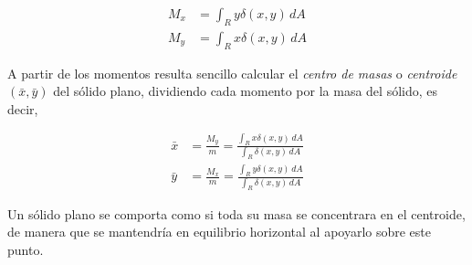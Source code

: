 \documentclass[
  a4paper,
]{scrreport}
\theoremstyle{plain}
\theoremstyle{definition}
\theoremstyle{plain}
\theoremstyle{plain}
\theoremstyle{definition}
\theoremstyle{definition}
\theoremstyle{remark}
\begin{document}
\begin{align*}
M_x 
&= \int_R y\delta(x,y)\,dA \\
M_y 
&= \int_R x\delta(x,y)\,dA
\end{align*}

A partir de los momentos resulta sencillo calcular el \emph{centro de
masas} o \emph{centroide} \((\bar x, \bar y)\) del sólido plano,
dividiendo cada momento por la masa del sólido, es decir,

\begin{align*}
\bar x 
&= \frac{M_y}{m}
= \frac{\int_R x\delta(x,y)\,dA}{\int_R \delta(x,y)\,dA} \\
\bar y
&= \frac{M_x}{m}
= \frac{\int_R y\delta(x,y)\,dA}{\int_R \delta(x,y)\,dA}
\end{align*}

\begin{tcolorbox}[enhanced jigsaw, titlerule=0mm, arc=.35mm, colframe=quarto-callout-note-color-frame, bottomrule=.15mm, opacitybacktitle=0.6, rightrule=.15mm, coltitle=black, colback=white, toprule=.15mm, title=\textcolor{quarto-callout-note-color}{\faInfo}\hspace{0.5em}{Nota}, leftrule=.75mm, bottomtitle=1mm, opacityback=0, breakable, colbacktitle=quarto-callout-note-color!10!white, toptitle=1mm, left=2mm]

Un sólido plano se comporta como si toda su masa se concentrara en el
centroide, de manera que se mantendría en equilibrio horizontal al
apoyarlo sobre este punto.

\end{tcolorbox}
\end{document}
